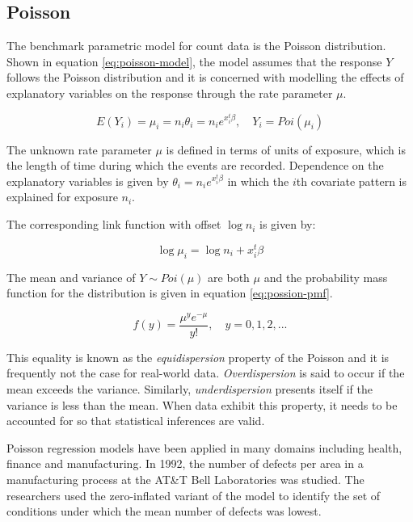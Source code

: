 \documentclass{thesis}
\begin{document}
\subsection{Poisson}

The benchmark parametric model for count data is the Poisson distribution\cite{cameron_trivedi_2013}. Shown in equation \ref{eq:poisson-model}, the model assumes that the response $Y$ follows the Poisson distribution and it is concerned with modelling the effects of explanatory variables on the response through the rate parameter $\mu$. 

\begin{equation}
    E(Y_i) = \mu_i = n_i\theta_i = n_ie^{x_i^t\beta},\hspace{1em}Y_i = Poi(\mu_i)
    \label{eq:poisson-model}
\end{equation}

The unknown rate parameter $\mu$ is defined in terms of units of exposure, which is the length of time during which the events are recorded\cite{cameron_trivedi_2013}. Dependence on the explanatory variables is given by $\theta_i = n_ie^{x_i^t\beta}$ in which the $i$th covariate pattern is explained for exposure $n_i$.

The corresponding link function with offset $\log{n_i}$ is given by:

\begin{equation}
    \log{\mu_i} = \log{n_i} + x_i^t\beta
\end{equation}

The mean and variance of $Y \sim Poi(\mu)$ are both $\mu$ and the probability mass function for the distribution is given in equation \ref{eq:possion-pmf}. 

\begin{equation}
f(y) = \frac{\mu^ye^{-\mu}}{y!},\hspace{1em}y = 0, 1, 2,...
\label{eq:possion-pmf}
\end{equation}

This equality is known as the \textit{equidispersion} property of the Poisson and it is frequently not the case for real-world data. \textit{Overdispersion} is said to occur if the mean exceeds the variance. Similarly, \textit{underdispersion} presents itself if the variance is less than the mean. When data exhibit this property, it needs to be accounted for so that statistical inferences are valid\cite{understanding-poisson}.

Poisson regression models have been applied in many domains including health, finance and manufacturing. In 1992, the number of defects per area in a manufacturing process at the AT\&T Bell Laboratories was studied\cite{defects}. The researchers used the zero-inflated variant of the model to identify the set of conditions under which the mean number of defects was lowest.
\end{document}
